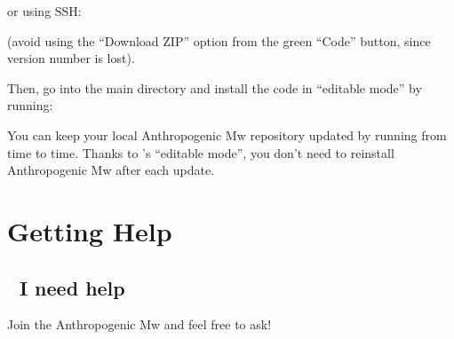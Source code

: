 \documentclass[letterpaper,10pt,english]{sphinxmanual}
\begin{document}
\begin{sphinxVerbatim}[commandchars=\\\{\}]
  
\end{sphinxVerbatim}

\sphinxAtStartPar
or using SSH:

\begin{sphinxVerbatim}[commandchars=\\\{\}]
  
\end{sphinxVerbatim}

\sphinxAtStartPar
(avoid using the “Download ZIP” option from the green “Code” button, since
version number is lost).

\sphinxAtStartPar
Then, go into the  main directory and install the code in
“editable mode” by running:

\begin{sphinxVerbatim}[commandchars=\\\{\}]
   
\end{sphinxVerbatim}

\sphinxAtStartPar
You can keep your local Anthropogenic Mw repository updated by running 
from time to time. Thanks to ’s “editable mode”, you don’t need to
reinstall Anthropogenic Mw after each update.

\sphinxstepscope


\chapter{Getting Help}
\label{\detokenize{getting_help:getting-help}}\label{\detokenize{getting_help:id1}}\label{\detokenize{getting_help::doc}}

\section{🙏 I need help}
\label{\detokenize{getting_help:i-need-help}}
\sphinxAtStartPar
Join the Anthropogenic Mw
and feel free to ask!
\end{document}
